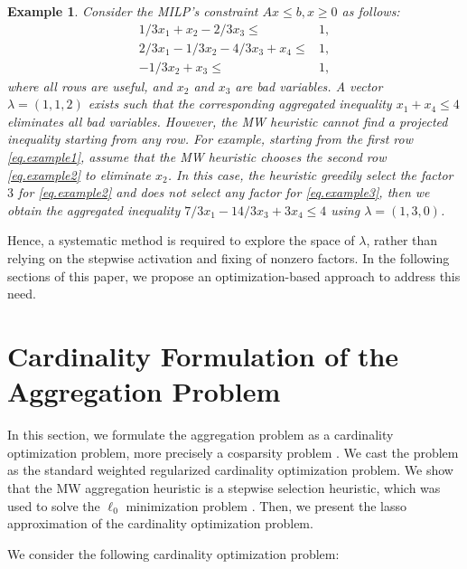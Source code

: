 \documentclass[a4paper,UKenglish,cleveref, autoref,  thm-restate]{lipics-v2021}
\newtheorem{example}{Example}
\begin{document}
	
	\begin{example}
		\label{example.1}
		Consider the MILP's constraint $Ax \le b, x \ge 0$ as follows:
		\begin{subequations}
			\label{eq.example}
			\begin{align}
				1/3x_1 +  x_2 - 2/3x_3\le& 1, \label{eq.example1} \\
				2/3x_1 - 1/3 x_2 - 4/3 x_3 + x_4\le& 1, \label{eq.example2} \\
				-1/3 x_2 + x_3\le& 1, \label{eq.example3}
			\end{align}
		\end{subequations}
		where all rows are useful,  and $x_2$ and $x_3$ are bad variables. A vector $\lambda = (1,1,2)$ exists such that the corresponding aggregated inequality $x_1  + x_4\le 4$ eliminates all bad variables. However, the MW heuristic cannot find a projected inequality starting from any row. For example, starting from the first row \eqref{eq.example1},  assume that the MW heuristic chooses the second row \eqref{eq.example2} to eliminate $x_2$. In this case, the heuristic greedily select the factor $3$ for \eqref{eq.example2} and does not select any factor for \eqref{eq.example3}, then  we obtain the aggregated inequality $7/3x_1 -14/3 x_3 + 3x_4 \le 4$ using $\lambda=(1,3,0)$.
	\end{example}
	Hence, a systematic method is required to explore the space of $\lambda$, rather than relying on the stepwise activation and fixing of nonzero factors. In the following sections of this paper, we propose an optimization-based approach to address this need.
	\section{Cardinality Formulation of the Aggregation Problem} \label{sec.card}
	
	
	In this section, we formulate the aggregation problem as a cardinality optimization problem, more precisely a cosparsity problem \cite{nam2013cosparse}. We cast the problem as the standard weighted regularized cardinality optimization problem. We show that the MW aggregation heuristic is a stepwise selection heuristic, which was used to solve the $\ell_0$ minimization problem \cite{hastie2017extended}. Then, we present the lasso approximation of the cardinality optimization problem.
	
	
	We consider the following  cardinality optimization problem:
	
\end{document}
